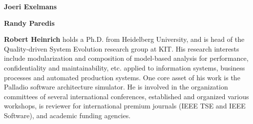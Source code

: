 \medskip
\noindent
\textbf{Joeri Exelmans} 

\medskip
\noindent
\textbf{Randy Paredis} 


\medskip
\noindent
\textbf{Robert Heinrich} holds a Ph.D. from Heidelberg University, and is head of the Quality-driven System Evolution research group at KIT. His research interests include modularization
and composition of model-based analysis for performance, confidentiality and maintainability, etc. applied to information systems, business processes and automated production systems. One core asset of his work is the Palladio software architecture simulator. He is involved in the organization committees of several international conferences, established and organized various workshops, is reviewer for international premium journals (IEEE TSE and IEEE Software), and academic funding agencies.

